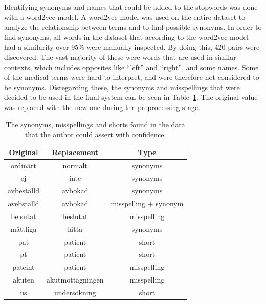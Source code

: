 Identifying synonyms and names that could be added to the stopwords was done with a word2vec model.
A word2vec model was used on the entire dataset to analyze the relationship between terms and to find possible synonyms.
In order to find synonyms, all words in the dataset that according to the word2vec model had a similarity over 95\% were manually inspected.
By doing this, 420 pairs were discovered.
The vast majority of these were words that are used in similar contexts, which includes opposites like ``left'' and ``right'', and some names.
Some of the medical terms were hard to interpret, and were therefore not considered to be synonyms.
Disregarding these, the synonyms and misspellings that were decided to be used in the final system can be seen in Table~\ref{tab:synonyms}.
The original value was replaced with the new one during the preprocessing stage.

\begin{table}
    \centering
    \begin{tabular}{|ccc|}
        \hline
        \textbf{Original} & \textbf{Replacement} & \textbf{Type} \\
        \hline
        ordinärt & normalt & synonyms \\
        ej & inte & synonyms \\
        avbeställd & avbokad & synonyms \\
        avebställd & avbokad & misspelling + synonym \\
        belsutat & beslutat & misspelling \\
        måttliga & lätta & synonyms \\
        pat & patient & short \\
        pt & patient & short \\
        pateint & patient & misspelling \\
        akuten & akutmottagningen & misspelling \\
        us & undersökning & short \\
        \hline
    \end{tabular}
    \caption{The synonyms, misspellings and shorts found in the data that the author could assert with confidence.}
    \label{tab:synonyms}
\end{table}

